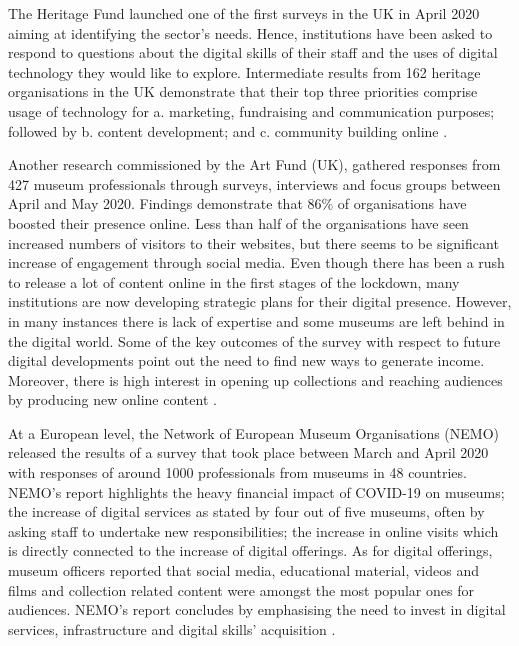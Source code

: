 \documentclass{egpubl}
\begin{document}
The Heritage Fund launched one of the first surveys in the UK in April 2020 aiming at identifying the sector's needs. Hence, institutions have been asked to respond to questions about the digital skills of their staff and the uses of digital technology they would like to explore. Intermediate results from 162 heritage organisations in the UK demonstrate that their top three priorities comprise usage of technology for a. marketing, fundraising and communication purposes; followed by b. content development; and c. community building online \cite{HeritageFund2020}.

Another research commissioned by the Art Fund (UK), gathered responses from 427 museum professionals through surveys, interviews and focus groups between April and May 2020. Findings demonstrate that 86\% of organisations have boosted their presence online. Less than half of the organisations have seen increased numbers of visitors to their websites, but there seems to be significant increase of engagement through social media. Even though there has been a rush to release a lot of content online in the first stages of the lockdown, many institutions are now developing strategic plans for their digital presence. However, in many instances there is lack of expertise and some museums are left behind in the digital world. Some of the key outcomes of the survey with respect to future digital developments point out the need to find new ways to generate income. Moreover, there is high interest in opening up collections and reaching audiences by producing new online content \cite{WaferHadley2020}.

At a European level, the Network of European Museum Organisations (NEMO) released the results of a survey that took place between March and April 2020 with responses of around 1000 professionals from museums in 48 countries. NEMO's report highlights the heavy financial impact of COVID-19 on museums; the increase of digital services as stated by four out of five museums, often by asking staff to undertake new responsibilities; the increase in online visits which is directly connected to the increase of digital offerings. As for digital offerings, museum officers reported that social media, educational material, videos and films and collection related content were amongst the most popular ones for audiences. NEMO's report concludes by emphasising the need to invest in digital services, infrastructure and digital skills' acquisition \cite{NetworkofEuropeanMuseumOrganisations2020}.
\end{document}
